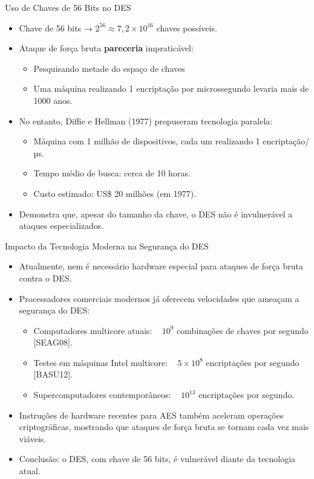 \begin{frame}{Uso de Chaves de 56 Bits no DES}
    \begin{itemize}
        \item Chave de 56 bits → $2^{56} \approx 7,2 \times 10^{16}$ chaves possíveis.
        \item Ataque de força bruta \textbf{pareceria} impraticável:
              \begin{itemize}
                  \item Pesquisando metade do espaço de chaves
                  \item Uma máquina realizando 1 encriptação por microssegundo levaria mais de 1000 anos.
              \end{itemize}
        \item No entanto, Diffie e Hellman (1977) propuseram tecnologia paralela:
              \begin{itemize}
                  \item Máquina com 1 milhão de dispositivos, cada um realizando 1 encriptação/µs.
                  \item Tempo médio de busca: cerca de 10 horas.
                  \item Custo estimado: US\$ 20 milhões (em 1977).
              \end{itemize}
        \item Demonstra que, apesar do tamanho da chave, o DES não é invulnerável a ataques especializados.
    \end{itemize}
\end{frame}

\begin{frame}{Impacto da Tecnologia Moderna na Segurança do DES}
    \begin{itemize}
        \item Atualmente, nem é necessário hardware especial para ataques de força bruta contra o DES.
        \item Processadores comerciais modernos já oferecem velocidades que ameaçam a segurança do DES:
              \begin{itemize}
                  \item Computadores multicore atuais: ~ $10^9$ combinações de chaves por segundo [SEAG08].
                  \item Testes em máquinas Intel multicore: ~ $5 \times 10^8$ encriptações por segundo [BASU12].
                  \item Supercomputadores contemporâneos: ~ $10^{13}$ encriptações por segundo.
              \end{itemize}
        \item Instruções de hardware recentes para AES também aceleram operações criptográficas, mostrando que ataques de força bruta se tornam cada vez mais viáveis.
        \item Conclusão: o DES, com chave de 56 bits, é vulnerável diante da tecnologia atual.
    \end{itemize}
\end{frame}

